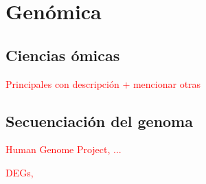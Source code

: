 \chapter{Genómica}

\section{Ciencias ómicas}

\textcolor{red}{Principales con descripción + mencionar otras}

\section{Secuenciación del genoma}

\textcolor{red}{Human Genome Project, ...}

\textcolor{red}{DEGs, }


